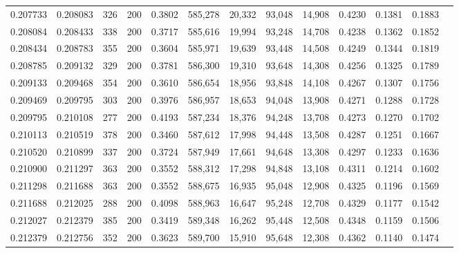 \begin{tabular}{rrrrrrrrrrrrr}
0.207733 & 0.208083 &   326 & 200 &                                     0.3802 & 585,278 &  20,332 &  93,048 &  14,908 & 0.4230 & 0.1381 & 0.1883 \\
0.208084 & 0.208433 &   338 & 200 &                                     0.3717 & 585,616 &  19,994 &  93,248 &  14,708 & 0.4238 & 0.1362 & 0.1852 \\
0.208434 & 0.208783 &   355 & 200 &                                     0.3604 & 585,971 &  19,639 &  93,448 &  14,508 & 0.4249 & 0.1344 & 0.1819 \\
0.208785 & 0.209132 &   329 & 200 &                                     0.3781 & 586,300 &  19,310 &  93,648 &  14,308 & 0.4256 & 0.1325 & 0.1789 \\
0.209133 & 0.209468 &   354 & 200 &                                     0.3610 & 586,654 &  18,956 &  93,848 &  14,108 & 0.4267 & 0.1307 & 0.1756 \\
0.209469 & 0.209795 &   303 & 200 &                                     0.3976 & 586,957 &  18,653 &  94,048 &  13,908 & 0.4271 & 0.1288 & 0.1728 \\
0.209795 & 0.210108 &   277 & 200 &                                     0.4193 & 587,234 &  18,376 &  94,248 &  13,708 & 0.4273 & 0.1270 & 0.1702 \\
0.210113 & 0.210519 &   378 & 200 &                                     0.3460 & 587,612 &  17,998 &  94,448 &  13,508 & 0.4287 & 0.1251 & 0.1667 \\
0.210520 & 0.210899 &   337 & 200 &                                     0.3724 & 587,949 &  17,661 &  94,648 &  13,308 & 0.4297 & 0.1233 & 0.1636 \\
0.210900 & 0.211297 &   363 & 200 &                                     0.3552 & 588,312 &  17,298 &  94,848 &  13,108 & 0.4311 & 0.1214 & 0.1602 \\
0.211298 & 0.211688 &   363 & 200 &                                     0.3552 & 588,675 &  16,935 &  95,048 &  12,908 & 0.4325 & 0.1196 & 0.1569 \\
0.211688 & 0.212025 &   288 & 200 &                                     0.4098 & 588,963 &  16,647 &  95,248 &  12,708 & 0.4329 & 0.1177 & 0.1542 \\
0.212027 & 0.212379 &   385 & 200 &                                     0.3419 & 589,348 &  16,262 &  95,448 &  12,508 & 0.4348 & 0.1159 & 0.1506 \\
0.212379 & 0.212756 &   352 & 200 &                                     0.3623 & 589,700 &  15,910 &  95,648 &  12,308 & 0.4362 & 0.1140 & 0.1474 \\

\end{tabular}
